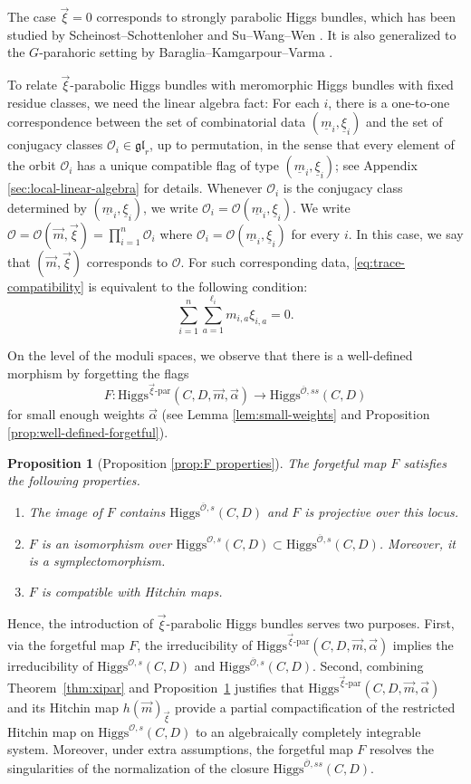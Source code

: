 \documentclass[11pt]{amsart}
\theoremstyle{plain}
\newtheorem{proposition}[theorem]{Proposition}
\theoremstyle{definition}
\theoremstyle{remark}
\newcommand{\ov}[1]{\overline{#1}}
\newcommand{\cO}{\mathcal O}
\newcommand{\Higgs}{\mathrm{Higgs}}
\def\uxi{{\underline{\xi}}}
\def\vxi{\vec{\xi}}
\def\vm{\vec{m}}
\def\um{{\underline{m}}}
\begin{document}
The case $\vxi=0$ corresponds to strongly parabolic Higgs bundles, which has been studied by Scheinost--Schottenloher \cite{ScheinostSchotten95} and Su--Wang--Wen \cite{Suwangwen2022}. It is also generalized to the $G$-parahoric setting by Baraglia--Kamgarpour--Varma \cite{baragliaKamgarpourVarma}. 



To relate $\vxi$-parabolic Higgs bundles with meromorphic Higgs bundles with  fixed residue classes, we need the linear algebra fact: For each $i$, there is a one-to-one correspondence between the set of combinatorial data  $(\um_i,\uxi_i)$ and the set of conjugacy classes $\cO_i \in \mathfrak{gl}_r$, up to permutation, in the sense that every element of the orbit $\cO_i$ has a unique
compatible flag of type $(\um_i,\uxi_i)$; see Appendix \ref{sec:local-linear-algebra} for
details. Whenever $\cO_i$ is the conjugacy class determined by $(\um_i,\uxi_i)$, we write
$\cO_i=\cO(\um_i,\uxi_i)$. We write $\cO=\cO(\vm,\vxi)=\prod_{i=1}^n\cO_i $ where
$\cO_i=\cO(\um_i,\uxi_i)$ for every $i$. In this case, we say that
$(\vm,\vxi)$ corresponds to $\cO$. For such corresponding data,
\eqref{eq:trace-compatibility} is equivalent to the following condition:
\begin{equation}\label{eq:Residue condition}
\sum_{i=1}^n\sum_{a=1}^{\ell_i} m_{i,a}\xi_{i,a}=0.
\end{equation}

On the level of the moduli spaces, we observe that there is a well-defined morphism by forgetting the flags
\[
F:\Higgs^{\vec\xi\text{-par}}(C,D,\vec m,\vec\alpha)\longrightarrow \Higgs^{\ov{\cO},ss}(C,D)
\]
for small enough weights $\vec{\alpha}$ (see Lemma \ref{lem:small-weights} and Proposition \ref{prop:well-defined-forgetful}).

\begin{proposition}[Proposition \ref{prop:F properties}]\label{prop:main} The forgetful map $F$ satisfies the following properties.
    \begin{enumerate}
        \item The image of $F$ contains $\Higgs^{\ov\cO,s}(C,D)$ and $F$ is projective over this locus.
        \item $F$ is an isomorphism over $\Higgs^{\cO,s}(C,D) \subset \Higgs^{\ov\cO,s}(C,D)$. Moreover, it is a symplectomorphism. 
        \item $F$ is compatible with Hitchin maps.
    \end{enumerate}
\end{proposition}
Hence, the introduction of $\vxi$-parabolic Higgs bundles serves two purposes. First, via the forgetful map $F$, the irreducibility of $\Higgs^{\vec\xi\text{-par}}(C,D,\vec m,\vec\alpha)$ implies the irreducibility of $\Higgs^{\cO,s}(C,D)$ and $ \Higgs^{\ov\cO,s}(C,D)$. Second, combining Theorem~\ref{thm:xipar} and Proposition~\ref{prop:main} justifies that $\Higgs^{\vec\xi\text{-par}}(C,D,\vec m,\vec\alpha)$ and its Hitchin map $h(\vm)_{\vxi}$ provide a partial compactification of the restricted Hitchin map on $\Higgs^{\cO,s}(C,D)$ to an algebraically completely integrable system. Moreover, under extra assumptions, the forgetful map $F$ resolves the singularities of the normalization of the closure $\Higgs^{\overline{\cO}, ss}(C,D)$. 
\end{document}
